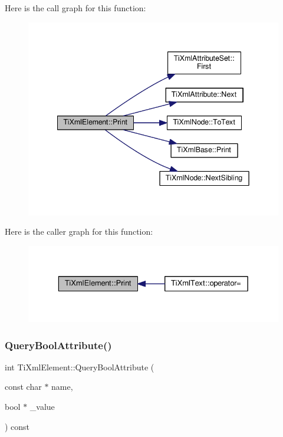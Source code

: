 Here is the call graph for this function\+:\nopagebreak
\begin{figure}[H]
\begin{center}
\leavevmode
\includegraphics[width=342pt]{class_ti_xml_element_aa31a15cddfb8601a31236fe7d2569fb4_cgraph}
\end{center}
\end{figure}
Here is the caller graph for this function\+:\nopagebreak
\begin{figure}[H]
\begin{center}
\leavevmode
\includegraphics[width=329pt]{class_ti_xml_element_aa31a15cddfb8601a31236fe7d2569fb4_icgraph}
\end{center}
\end{figure}
\mbox{\label{class_ti_xml_element_a5789b1488af75b6ae37a749700495ceb}} 
\subsubsection{\texorpdfstring{Query\+Bool\+Attribute()}{QueryBoolAttribute()}}
{\footnotesize\ttfamily int Ti\+Xml\+Element\+::\+Query\+Bool\+Attribute (\begin{DoxyParamCaption}\item[{const char $\ast$}]{name,  }\item[{bool $\ast$}]{\+\_\+value }\end{DoxyParamCaption}) const}

